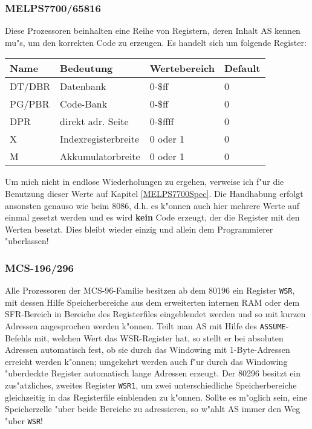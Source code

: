 \documentclass[12pt,a4paper,twoside]{report}
\newcommand{\bb}[1]{{\bf #1}}
\newcommand{\tty}[1]{{\tt #1}}
\begin{document}

\subsubsection{MELPS7700/65816}

Diese Prozessoren beinhalten eine Reihe von Registern, deren Inhalt AS
kennen mu"s, um den korrekten Code zu erzeugen.  Es handelt sich um folgende
Register:
\begin{center}\begin{tabular}{|l|l|l|l|}
\hline
Name  & Bedeutung           & Wertebereich & Default\\
\hline
\hline
DT/DBR & Datenbank           & 0-\$ff       & 0 \\
PG/PBR & Code-Bank           & 0-\$ff       & 0 \\
DPR   & direkt adr. Seite   & 0-\$ffff     & 0 \\
X     & Indexregisterbreite & 0 oder 1     & 0 \\
M     & Akkumulatorbreite   & 0 oder 1     & 0 \\
\hline
\end{tabular}\end{center}
\par
Um mich nicht in endlose Wiederholungen zu ergehen, verweise ich f"ur die
Benutzung dieser Werte auf Kapitel \ref{MELPS7700Spec}.  Die Handhabung
erfolgt ansonsten genauso wie beim 8086, d.h. es k"onnen auch hier mehrere
Werte auf einmal gesetzt werden und es wird \bb{kein} Code erzeugt, der
die Register mit den Werten besetzt.  Dies bleibt wieder einzig und allein
dem Programmierer "uberlassen!


\subsubsection{MCS-196/296}

Alle Prozessoren der MCS-96-Familie besitzen ab dem 80196 ein Register \tty{WSR},
mit dessen Hilfe Speicherbereiche aus dem erweiterten internen RAM
oder dem SFR-Bereich in Bereiche des Registerfiles eingeblendet werden
und so mit kurzen Adressen angesprochen werden k"onnen.  Teilt man AS
mit Hilfe des \tty{ASSUME}-Befehls mit, welchen Wert das WSR-Register
hat, so stellt er bei absoluten Adressen automatisch fest, ob  sie
durch das Windowing mit 1-Byte-Adressen erreicht werden k"onnen;
umgekehrt werden auch f"ur durch das Windowing "uberdeckte Register
automatisch lange Adressen erzeugt.  Der 80296 besitzt ein zus"atzliches,
zweites Register \tty{WSR1}, um zwei unterschiedliche Speicherbereiche
gleichzeitig in das Registerfile einblenden zu k"onnen.  Sollte
es m"oglich sein, eine Speicherzelle "uber beide Bereiche zu adressieren,
so w"ahlt AS immer den Weg "uber \tty{WSR}!
\end{document}

